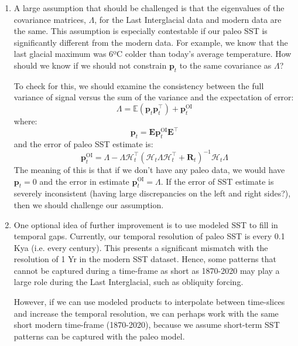 \documentclass{article}
\begin{document}
\begin{enumerate}
    \item A large assumption that should be challenged is that the eigenvalues of the covariance matrices, $\Lambda$, for the Last Interglacial data and modern data are the same. 
    This assumption is especially contestable if our paleo SST is significantly different from the modern data. For example, we know that the last glacial maximum was 6ºC colder than today's average temperature. How should we know if we should not constrain $\textbf{p}_t$ to the same covariance as $\Lambda$?

    To check for this, we should examine the consistency between the full variance of signal versus the sum of the variance and the expectation of error:
    $$\Lambda = \mathbb{E}(\textbf{p}_t\textbf{p}_t^\intercal)+\textbf{p}^{\text{OI}}_t$$
    where:
    $$\textbf{p}_t = \textbf{E} \textbf{p}_t^{\text{OI}} \textbf{E}^\intercal$$
    and the error of paleo SST estimate is:
    $$\textbf{p}_t^{\text{OI}} = \Lambda - \Lambda \mathcal{H}^\intercal_t (\mathcal{H}_t \Lambda \mathcal{H}_t^\intercal + \textbf{R}_t)^{-1} \mathcal{H}_t\Lambda$$
    The meaning of this is that if we don't have any paleo data, we would have $\textbf{p}_t = 0$ and the error in estimate $\textbf{p}_t^{\text{OI}} = \Lambda$. If the error of SST estimate is severely inconsistent (having large discrepancies on the left and right sides?), then we should challenge our assumption.

    \item One optional idea of further improvement is to use modeled SST to fill in temporal gaps. Currently, our temporal resolution of paleo SST is every 0.1 Kya (i.e. every century). This presents a significant mismatch with the resolution of 1 Yr in the modern SST dataset. Hence, some patterns that cannot be captured during a time-frame as short as 1870-2020 may play a large role during the Last Interglacial, such as obliquity forcing. 
    
    However, if we can use modeled products to interpolate between time-slices and increase the temporal resolution, we can perhaps work with the same short modern time-frame (1870-2020), because we assume short-term SST patterns can be captured with the paleo model.
    
\end{enumerate}
\end{document}
